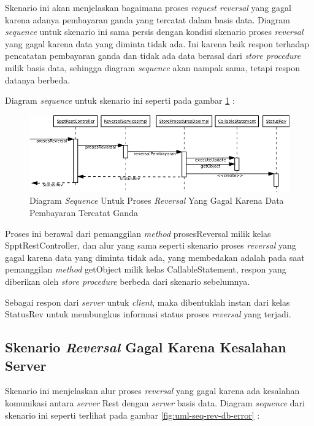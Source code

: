 Skenario ini akan menjelaskan bagaimana proses \textit{request reversal} yang gagal karena adanya pembayaran ganda yang tercatat dalam basis data. Diagram \textit{sequence} untuk skenario ini sama persis dengan kondisi skenario proses \textit{reversal} yang gagal karena data yang diminta tidak ada. Ini karena baik respon terhadap pencatatan pembayaran ganda dan tidak ada data berasal dari \textit{store procedure} milik basis data, sehingga diagram \textit{sequence} akan nampak sama, tetapi respon datanya berbeda.

Diagram \textit{sequence} untuk skenario ini seperti pada gambar \ref{fig:uml-seq-rev-double} :

\begin{figure}[H]
  \centering
  \includegraphics[width=1\textwidth]{./resources/uml/uml-seq-rev-null}
  \caption{Diagram \textit{Sequence} Untuk Proses \textit{Reversal} Yang Gagal Karena Data Pembayaran Tercatat Ganda}
  \label{fig:uml-seq-rev-double}
\end{figure}

Proses ini berawal dari pemanggilan \textit{method} prosesReversal milik kelas SpptRestController, dan alur yang sama seperti skenario proses \textit{reversal} yang gagal karena data yang diminta tidak ada, yang membedakan adalah pada saat pemanggilan \textit{method} getObject milik kelas CallableStatement, respon yang diberikan oleh \textit{store procedure} berbeda dari skenario sebelumnya.

Sebagai respon dari \textit{server} untuk \textit{client}, maka dibentuklah instan dari kelas StatusRev untuk membungkus informasi status proses \textit{reversal} yang terjadi.

\subsection{Skenario \textit{Reversal} Gagal Karena Kesalahan Server}

Skenario ini menjelaskan alur proses \textit{reversal} yang gagal karena ada kesalahan komunikasi antara \textit{server} Rest dengan \textit{server} basis data. Diagram \textit{sequence} dari skenario ini seperti terlihat pada gambar \ref{fig:uml-seq-rev-db-error} :

